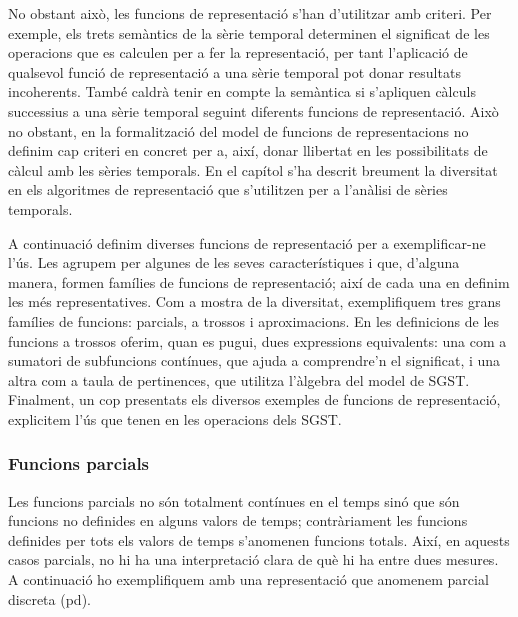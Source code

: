 No obstant això, les funcions de representació s'han d'utilitzar amb
criteri. Per exemple, els trets semàntics de la sèrie temporal
determinen el significat de les operacions que es calculen per a fer
la representació, per tant l'aplicació de qualsevol funció de
representació a una sèrie temporal pot donar resultats
incoherents. També caldrà tenir en compte la semàntica si s'apliquen
càlculs successius a una sèrie temporal seguint diferents funcions de
representació.  Això no obstant, en la formalització del model de
funcions de representacions no definim cap criteri en concret per a,
així, donar llibertat en les possibilitats de càlcul amb les sèries
temporals. En el capítol  s'ha descrit
breument la diversitat en els algoritmes de representació que
s'utilitzen per a l'anàlisi de sèries temporals.


A continuació definim diverses funcions de representació per a
exemplificar-ne l'ús. Les agrupem per algunes de les seves
característiques i que, d'alguna manera, formen famílies de funcions
de representació; així de cada una en definim les més representatives.
Com a mostra de la diversitat, exemplifiquem tres grans famílies de
funcions: parcials, a trossos i aproximacions.  En les definicions de
les funcions a trossos oferim, quan es pugui, dues expressions
equivalents: una com a sumatori de subfuncions contínues, que ajuda a
comprendre'n el significat, i una altra com a taula de pertinences,
que utilitza l'àlgebra del model de \gls{SGST}.
Finalment, un cop presentats els diversos
exemples de funcions de representació, explicitem l'ús que tenen en
les operacions dels \gls{SGST}.



\subsubsection{Funcions parcials}


Les funcions parcials no són totalment contínues en el temps sinó que
són funcions no definides en alguns valors de temps; contràriament les
funcions definides per tots els valors de temps s'anomenen funcions
totals. Així, en aquests casos parcials, no hi ha una interpretació
clara de què hi ha entre dues mesures.  A continuació ho exemplifiquem
amb una representació que anomenem parcial discreta (\gls{pd}).

